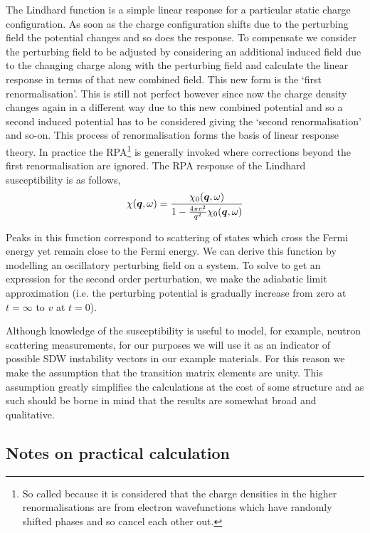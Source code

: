 The Lindhard function is a simple linear response for a particular static charge configuration. As soon as the charge configuration shifts due to the perturbing field the potential changes and so does the response. To compensate we consider the perturbing field to be adjusted by considering an additional induced field due to the changing charge along with the perturbing field and calculate the linear response in terms of that new combined field. This new form is the `first renormalisation'. This is still not perfect however since now the charge density changes again in a different way due to this new combined potential and so a second induced potential has to be considered giving the `second renormalisation' and so-on. This process of renormalisation forms the basis of linear response theory. In practice the \ac{RPA}\footnote{So called because it is considered that the charge densities in the higher renormalisations are from electron wavefunctions which have randomly shifted phases and so cancel each other out.} is generally invoked where corrections beyond the first renormalisation are ignored. The \ac{RPA} response of the Lindhard susceptibility is as follows,
\begin{equation}
    \chi(\boldsymbol{q},\omega) = \frac{\chi_0(\boldsymbol{q}, \omega)}{1 - \frac{4\pi e^2}{q^2} \chi_0(\boldsymbol{q}, \omega)}
\end{equation}


Peaks in this function correspond to scattering of states which cross the Fermi energy yet remain close to the Fermi energy.  We can derive this function by modelling an oscillatory perturbing field on a system. To solve to get an expression for the second order perturbation, we make the adiabatic limit approximation (i.e. the perturbing potential is gradually increase from zero at $t=\infty$ to $v$ at $t=0$).


Although knowledge of the susceptibility is useful to model, for example, neutron scattering measurements, for our purposes we will use it as an indicator of possible \ac{SDW} instability vectors in our example materials. For this reason we make the assumption that the transition matrix elements are unity. This assumption greatly simplifies the calculations at the cost of some structure and as such should be borne in mind that the results are somewhat broad and qualitative.


\subsection{Notes on practical calculation}

